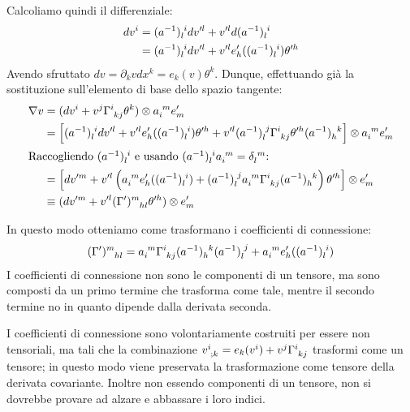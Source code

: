 Calcoliamo quindi il differenziale:
\begin{align*}
    dv^i &= \tensor{(a^{-1})}{_l^i}dv'^l + v'^l d\tensor{(a^{-1})}{_l^i}\\
    &= \tensor{(a^{-1})}{_l^i}dv'^l+ v'^l e'_h(\tensor{(a^{-1})}{_l^i})\theta'^h
\end{align*}
Avendo sfruttato $dv = \partial_k vdx^k = e_k(v)\theta^k$. Dunque, effettuando già la sostituzione sull'elemento di base dello spazio tangente:
\begin{align*}
    \nabla v &= (dv^i + v^j \tensor{\Gamma}{^i_{kj}}\theta^k)\otimes \tensor{a}{_i^m}e'_m \\
    &= \left[\tensor{(a^{-1})}{_l^i}dv'^l+ v'^l e'_h(\tensor{(a^{-1})}{_l^i})\theta'^h + v'^l\tensor{(a^{-1})}{_l^j}\tensor{\Gamma}{^i_{kj}}\theta'^h\tensor{(a^{-1})}{_h^k}\right] \otimes \tensor{a}{_i^m}e'_m  \\
\intertext{Raccogliendo $\tensor{(a^{-1})}{_l^i}$ e usando $\tensor{(a^{-1})}{_l^i}\tensor{a}{_i^m}=\tensor{\delta}{_l^m}$:}
    &=\left[ dv'^m  + v'^l\left( \tensor{a}{_i^m}e'_h(\tensor{(a^{-1})}{_l^i}) + \tensor{(a^{-1})}{_l^j}\tensor{a}{_i^m}\tensor{\Gamma}{^i_{kj}}\tensor{(a^{-1})}{_h^k}\right) \theta'^h \right]\otimes e'_m \\
    &\equiv (dv'^m + v'^l \tensor{(\Gamma')}{^m_{hl}}\theta'^h )\otimes e'_m
\end{align*}

In questo modo otteniamo come trasformano i coefficienti di connessione:
\begin{equation}
    \tensor{(\Gamma')}{^m_{hl}} = \tensor{a}{_i^m}\tensor{\Gamma}{^i_{kj}}\tensor{(a^{-1})}{_h^k}\tensor{(a^{-1})}{_l^j} + \tensor{a}{_i^m}e'_h(\tensor{(a^{-1})}{_l^i})
    \label{eq.trasform_christoffel}
\end{equation}
I coefficienti di connessione non sono le componenti di un tensore, ma sono composti da un primo termine che trasforma come tale, mentre il secondo termine no in quanto dipende dalla derivata seconda.

I coefficienti di connessione sono volontariamente costruiti per essere non tensoriali, ma tali che la combinazione $\tensor{v}{^i_{;k}}= e_k(v^i) + v^j\tensor{\Gamma}{^i_{kj}}$ trasformi come un tensore; in questo modo viene preservata la trasformazione come tensore della derivata covariante. Inoltre non essendo componenti di un tensore, non si dovrebbe provare ad alzare e abbassare i loro indici.

